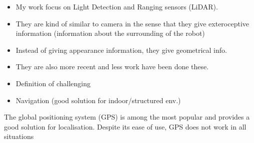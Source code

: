\begin{itemize}
    \item My work focus on Light Detection and Ranging sensors (LiDAR).
    \item They are kind of similar to camera in the sense that they give exteroceptive information (information about the surrounding of the robot)
    \item Instead of giving appearance information, they give geometrical info.
    \item They are also more recent and less work have been done these.
\end{itemize}
\begin{itemize}
    \item Definition of challenging
    \item Navigation (good solution for indoor/structured env.)
\end{itemize}

The global positioning system (GPS) is among the most popular and provides a good solution for localisation. Despite its ease of use, GPS does not work in all situations
